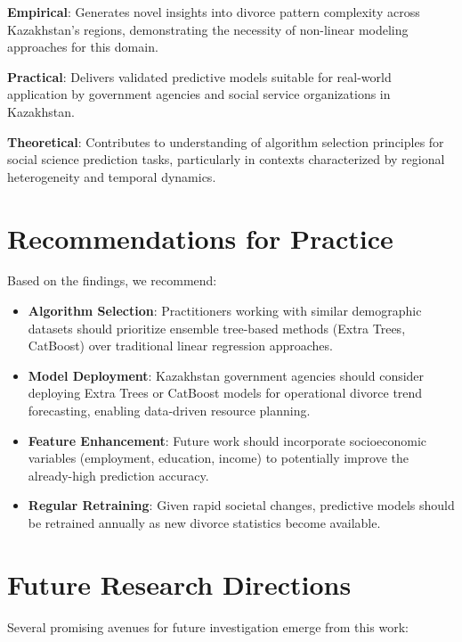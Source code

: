\textbf{Empirical}: Generates novel insights into divorce pattern complexity across Kazakhstan's regions, demonstrating the necessity of non-linear modeling approaches for this domain.

\textbf{Practical}: Delivers validated predictive models suitable for real-world application by government agencies and social service organizations in Kazakhstan.

\textbf{Theoretical}: Contributes to understanding of algorithm selection principles for social science prediction tasks, particularly in contexts characterized by regional heterogeneity and temporal dynamics.

\section{Recommendations for Practice}

Based on the findings, we recommend:

\begin{itemize}
    \item \textbf{Algorithm Selection}: Practitioners working with similar demographic datasets should prioritize ensemble tree-based methods (Extra Trees, CatBoost) over traditional linear regression approaches.
    
    \item \textbf{Model Deployment}: Kazakhstan government agencies should consider deploying Extra Trees or CatBoost models for operational divorce trend forecasting, enabling data-driven resource planning.
    
    \item \textbf{Feature Enhancement}: Future work should incorporate socioeconomic variables (employment, education, income) to potentially improve the already-high prediction accuracy.
    
    \item \textbf{Regular Retraining}: Given rapid societal changes, predictive models should be retrained annually as new divorce statistics become available.
\end{itemize}

\section{Future Research Directions}

Several promising avenues for future investigation emerge from this work:

